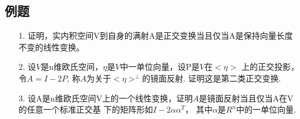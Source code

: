 \subsection{例题}
\begin{itemize}
    \item[1.] 证明，实内积空间V到自身的满射A是正交变换当且仅当A是保持向量长度不变的线性变换。
    \vspace{2cm}

    \item[2.] 设$V$是n维欧氏空间，$\eta$是$V$中一单位向量，设P是$V$在$<\eta>$
    上的正交投影，令$A=I-2P$, 称$A$为关于$<\eta>^{\perp}$的镜面反射. 证明这是第二类正交变换. 
    \vspace{2cm}

        
            
    
    \item[3.] 设A是n维欧氏空间V上的一个线性变换，证明$A$是镜面反射当且仅当A在V的任意一个标准正交基
    下的矩阵形如$I-2\alpha \alpha^T$， 其中$\alpha$是$R^n$中的一单位向量.
    \vspace{3cm}


\end{itemize}
